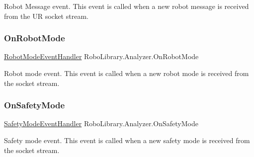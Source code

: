 Robot Message event. This event is called when a new robot message is received from the UR socket stream.

\hypertarget{class_robo_library_1_1_analyzer_a18356690d4cc11656007057cca93f278}{}\label{class_robo_library_1_1_analyzer_a18356690d4cc11656007057cca93f278} 
\subsubsection{\texorpdfstring{On\+Robot\+Mode}{OnRobotMode}}
{\footnotesize\ttfamily \hyperlink{class_robo_library_1_1_analyzer_aa1d0cf635115d275b8488aab662610fa}{Robot\+Mode\+Event\+Handler} Robo\+Library.\+Analyzer.\+On\+Robot\+Mode\hspace{0.3cm}{\ttfamily [static]}}



Robot mode event. This event is called when a new robot mode is received from the socket stream.

\hypertarget{class_robo_library_1_1_analyzer_a77e89608a449d5ae30eadf9b2d1ed8e3}{}\label{class_robo_library_1_1_analyzer_a77e89608a449d5ae30eadf9b2d1ed8e3} 
\subsubsection{\texorpdfstring{On\+Safety\+Mode}{OnSafetyMode}}
{\footnotesize\ttfamily \hyperlink{class_robo_library_1_1_analyzer_ae03a29ceaec0141398e05cba9cbfba4d}{Safety\+Mode\+Event\+Handler} Robo\+Library.\+Analyzer.\+On\+Safety\+Mode\hspace{0.3cm}{\ttfamily [static]}}



Safety mode event. This event is called when a new safety mode is received from the socket stream.

\hypertarget{class_robo_library_1_1_analyzer_aed192ad0336a1115cf10504bcf5abfc5}{}\label{class_robo_library_1_1_analyzer_aed192ad0336a1115cf10504bcf5abfc5} 
